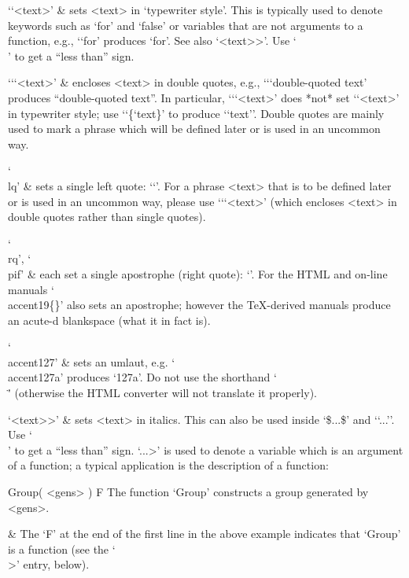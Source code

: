 \beginitems

`\lq<text>\pif' &
    sets <text> in `typewriter style'.
    This is typically used to denote {\GAP} keywords such  as  `for'  and
    `false' or variables that are not  arguments  to  a  function,  e.g.,
    `{\lq}for\pif' produces `for'.
    See also `\<<text>>'.
    Use `\\\<' to get a ``less than'' sign.

`\lq\lq<text>\pif\pif' &
    encloses <text> in double quotes,
    e.g., `\lq{\lq}double-quoted text\pif\pif' produces
    ``double-quoted text''.
    In particular, `\lq\lq<text>\pif\pif' does *not* set  `\lq<text>\pif'
    in typewriter  style;  use  `{\lq\{{\lq}text\pif\}\pif}'  to  produce
    `{`text'}'. Double quotes are mainly used to mark a phrase which will
    be defined later or is used in an uncommon way.

`\\lq' &
    sets a single left quote: `\lq'.
    For a phrase <text> that is to be defined later  or  is  used  in  an
    uncommon way, please use `\lq\lq<text>\pif\pif' (which encloses <text>
    in double quotes rather than single quotes).

`\\rq', `\\pif' &
    each set a single apostrophe (right quote): `\pif'.  For the HTML and
    on-line manuals `\\accent19\{\}' also sets an apostrophe; however the
    {\TeX}-derived manuals produce an acute-d blankspace (what it in fact
    is).

`\\accent127' &
    sets an umlaut, e.g. `\\accent127a' produces  `\accent127a'.  Do  not
    use the shorthand `\\\"'  (otherwise  the  HTML  converter  will  not
    translate it properly).

`\<<text>>' &
    sets <text> in italics. This can also be used  inside  `\$...\$'  and
    `{`...'}'. Use `\\\<' to get a ``less than'' sign. `\<...>'  is  used
    to denote a variable which is an argument of a  function;  a  typical
    application is the description of a function:

\begintt
\>Group( <gens> ) F
The function `Group' constructs a group generated by <gens>.
\endtt

  &
    The `F' at the end of the first line in the above  example  indicates
    that `Group' is a function (see the `\\>' entry, below).

